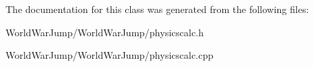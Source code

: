 The documentation for this class was generated from the following files\+:\begin{DoxyCompactItemize}
\item 
World\+War\+Jump/\+World\+War\+Jump/physicscalc.\+h\item 
World\+War\+Jump/\+World\+War\+Jump/physicscalc.\+cpp\end{DoxyCompactItemize}
